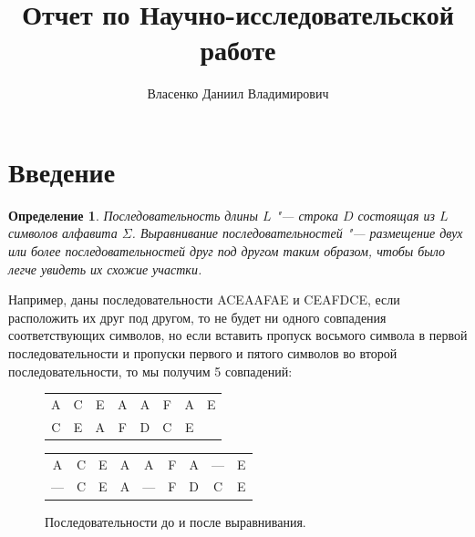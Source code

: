 \documentclass[specialist,
substylefile = spbu_report.rtx,
subf,href,colorlinks=true, 12pt]{disser}
\newtheorem{defenition}{Определение}
\begin{document}
	
	\title{Отчет по Научно-исследовательской работе}	
	\author{Власенко Даниил Владимирович}
	\date{\number\year}	
	\maketitle
	\tableofcontents
	
	
	\section{Введение}
		\begin{defenition}
		Последовательность длины $L$ "--- строка $D$ состоящая из $L$ символов алфавита $\Sigma$. Выравнивание последовательностей  "--- размещение двух или более последовательностей друг под другом таким образом, чтобы было легче увидеть их схожие участки. 
		\end{defenition}
		Например, даны последовательности ACEAAFAE и CEAFDCE, если расположить их друг под другом, то не будет ни одного совпадения соответствующих символов, но если вставить пропуск восьмого символа в первой последовательности и пропуски первого и пятого символов во второй последовательности, то мы получим 5 совпадений:
		
		\begin{figure}[h]
			\centering			
			\begin{tabular}{cccccccc}
				A&C&E&A&A&F&A&E\\
				C&E&A&F&D&C&E&\\
			\end{tabular}
		\end{figure}
		\begin{figure}[h]
			\centering			
			\begin{tabular}{ccccccccc}
				A&C&E&A&A&F&A&—&E\\
				—&C&E&A&—&F&D&C&E\\
			\end{tabular}
		\caption{Последовательности до и после выравнивания.} \label{fg:1}
		\end{figure}
	
\end{document}
